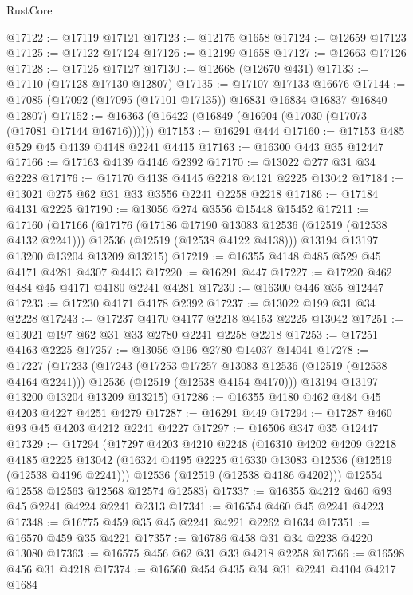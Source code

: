\begin{lexlean}{RustCore}
\begin{coremodule}
@17122 := @17119 @17121
@17123 := @12175 @1658
@17124 := @12659 @17123
@17125 := @17122 @17124
@17126 := @12199 @1658
@17127 := @12663 @17126
@17128 := @17125 @17127
@17130 := @12668 (@12670 @431)
@17133 := @17110 (@17128 @17130 @12807)
@17135 := @17107 @17133 @16676
@17144 := @17085 (@17092 (@17095 (@17101 @17135)) @16831 @16834 @16837 @16840 @12807)
@17152 := @16363 (@16422 (@16849 (@16904 (@17030 (@17073 (@17081 @17144 @16716))))))
@17153 := @16291 @444
@17160 := @17153 @485 @529 @45 @4139 @4148 @2241 @4415
@17163 := @16300 @443 @35 @12447
@17166 := @17163 @4139 @4146 @2392
@17170 := @13022 @277 @31 @34 @2228
@17176 := @17170 @4138 @4145 @2218 @4121 @2225 @13042
@17184 := @13021 @275 @62 @31 @33 @3556 @2241 @2258 @2218
@17186 := @17184 @4131 @2225
@17190 := @13056 @274 @3556 @15448 @15452
@17211 := @17160
    (@17166
      (@17176
        (@17186 @17190 @13083 @12536 (@12519 (@12538 @4132 @2241)))
        @12536
        (@12519 (@12538 @4122 @4138)))
      @13194
      @13197
      @13200
      @13204
      @13209
      @13215)
@17219 := @16355 @4148 @485 @529 @45 @4171 @4281 @4307 @4413
@17220 := @16291 @447
@17227 := @17220 @462 @484 @45 @4171 @4180 @2241 @4281
@17230 := @16300 @446 @35 @12447
@17233 := @17230 @4171 @4178 @2392
@17237 := @13022 @199 @31 @34 @2228
@17243 := @17237 @4170 @4177 @2218 @4153 @2225 @13042
@17251 := @13021 @197 @62 @31 @33 @2780 @2241 @2258 @2218
@17253 := @17251 @4163 @2225
@17257 := @13056 @196 @2780 @14037 @14041
@17278 := @17227
    (@17233
      (@17243
        (@17253 @17257 @13083 @12536 (@12519 (@12538 @4164 @2241)))
        @12536
        (@12519 (@12538 @4154 @4170)))
      @13194
      @13197
      @13200
      @13204
      @13209
      @13215)
@17286 := @16355 @4180 @462 @484 @45 @4203 @4227 @4251 @4279
@17287 := @16291 @449
@17294 := @17287 @460 @93 @45 @4203 @4212 @2241 @4227
@17297 := @16506 @347 @35 @12447
@17329 := @17294
    (@17297
      @4203
      @4210
      @2248
      (@16310
        @4202
        @4209
        @2218
        @4185
        @2225
        @13042
        (@16324 @4195 @2225 @16330 @13083 @12536 (@12519 (@12538 @4196 @2241)))
        @12536
        (@12519 (@12538 @4186 @4202)))
      @12554
      @12558
      @12563
      @12568
      @12574
      @12583)
@17337 := @16355 @4212 @460 @93 @45 @2241 @4224 @2241 @2313
@17341 := @16554 @460 @45 @2241 @4223
@17348 := @16775 @459 @35 @45 @2241 @4221 @2262 @1634
@17351 := @16570 @459 @35 @4221
@17357 := @16786 @458 @31 @34 @2238 @4220 @13080
@17363 := @16575 @456 @62 @31 @33 @4218 @2258
@17366 := @16598 @456 @31 @4218
@17374 := @16560 @454 @435 @34 @31 @2241 @4104 @4217 @1684

\end{coremodule}
\end{lexlean}
